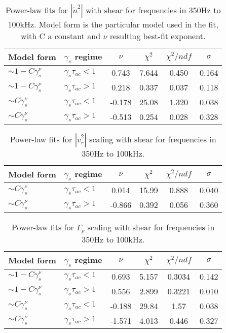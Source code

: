 \documentclass[aip,pop,amsmath,amssymb,preprint,superscriptaddress]{revtex4-1} %
\begin{document}
\begin{table}
\caption{\label{tab:table1}Power-law fits for $|\tilde{n}^{2}|$  with shear for frequencies in 350Hz to 100kHz. Model form is the particular model used in the fit, with C a constant and $\nu$ resulting best-fit exponent.}
\begin{ruledtabular}
\begin{tabular}{llcccc}
Model form&$\gamma_{s}$ regime&$\nu$&$\chi^2$&$\chi^2/ndf$&$\sigma$\\
\hline
$\sim 1-C\gamma_{s}^\nu$&$\gamma_{s}\tau_{ac}<1$&0.743&7.644&0.450&0.164\\
$\sim 1-C\gamma_{s}^\nu$&$\gamma_{s}\tau_{ac}>1$&0.218&0.337&0.037&0.118\\
$\sim C\gamma_{s}^\nu$&$\gamma_{s}\tau_{ac}<1$&-0.178&25.08&1.320&0.038\\
$\sim C\gamma_{s}^\nu$&$\gamma_{s}\tau_{ac}>1$&-0.513&0.254&0.028&0.328\\
\end{tabular}
\end{ruledtabular}
\end{table}

\begin{table}
\caption{\label{tab:table2}Power-law fits for $|\tilde{v}_{r}^{2}|$ scaling with shear for frequencies in 350Hz to 100kHz.}
\begin{ruledtabular}
\begin{tabular}{llcccc}
Model form&$\gamma_{s}$ regime&$\nu$&$\chi^2$&$\chi^2/ndf$&$\sigma$\\
\hline
$\sim C\gamma_{s}^\nu$&$\gamma_{s}\tau_{ac}<1$&0.014&15.99&0.888&0.040\\
$\sim C\gamma_{s}^\nu$&$\gamma_{s}\tau_{ac}>1$&-0.866&0.392&0.056&0.360\\
\end{tabular}
\end{ruledtabular}
\end{table}

\begin{table}
\caption{\label{tab:table3}Power-law fits for $\Gamma_{p}$ scaling with shear for frequencies in 350Hz to 100kHz.}
\begin{ruledtabular}
\begin{tabular}{llcccc}
Model form&$\gamma_{s}$ regime&$\nu$&$\chi^2$&$\chi^2/ndf$&$\sigma$\\
\hline
$\sim 1-C\gamma_{s}^\nu$&$\gamma_{s}\tau_{ac}<1$ &0.693   &5.157    &0.3034   &0.142\\
$\sim 1-C\gamma_{s}^\nu$&$\gamma_{s}\tau_{ac}>1$ &0.556   &2.899    &0.3221   &0.010\\
$\sim C\gamma_{s}^\nu$&$\gamma_{s}\tau_{ac}<1$   &-0.188  &29.84    &1.57     &0.038\\
$\sim C\gamma_{s}^\nu$&$\gamma_{s}\tau_{ac}>1$   &-1.571  &4.013    &0.446    &0.327\\
\end{tabular}
\end{ruledtabular}
\end{table}
\end{document}
